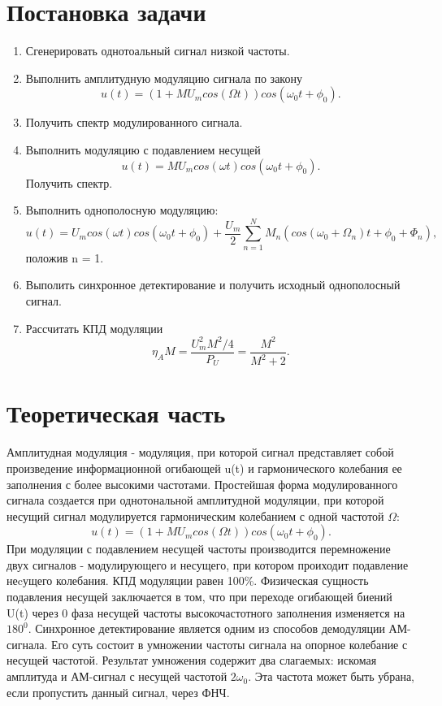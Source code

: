 \documentclass[10pt,a4paper]{report}
\begin{document}
\section{Постановка задачи}
	\begin{enumerate}
		\item Сгенерировать однотоальный сигнал низкой частоты.
		\item Выполнить амплитудную модуляцию сигнала по закону
				\begin{equation}
					u(t) = (1+MU_m cos(\Omega t))cos(\omega_0 t+\phi_0).
				\end{equation}
		\item Получить спектр модулированного сигнала.
		\item Выполнить модуляцию с подавлением несущей 
				\begin{equation}
					u(t) = MU_m cos(\omega t)cos(\omega_0 t+\phi_0).
				\end{equation}
		      Получить спектр. 
		\item Выполнить однополосную модуляцию:
				\begin{equation}
					u(t) = U_m cos(\omega t)cos(\omega_0 t+\phi_0)+\frac{U_m}{2}\sum_{n=1}^N M_n (cos(\omega_0 + \Omega_n )t + \phi_0 + \Phi_n ),
				\end{equation}
				положив n = 1.
		\item Выполить синхронное детектирование и получить исходный однополосный сигнал.
		\item Рассчитать КПД модуляции
				\begin{equation}
					\eta_A M = \frac{U_m ^2 M^2 /4}{P_U} = \frac{M^2}{M^2 + 2}.
				\end{equation}
	\end{enumerate}
\section{Теоретическая часть}
Амплитудная модуляция - модуляция, при которой сигнал представляет собой произведение информационной огибающей u(t) и гармонического колебания ее заполнения с более высокими частотами. Простейшая форма модулированного сигнала создается при однотональной амплитудной модуляции, при которой несущий сигнал модулируется гармоническим колебанием с одной частотой $\Omega$:
	\begin{equation}
		u(t) = (1+MU_m cos(\Omega t))cos(\omega_0 t+\phi_0).
	\end{equation}
При модуляции с подавлением несущей частоты производится перемножение двух сигналов - модулирующего и несущего, при котором проиходит подавление неcущего колебания. КПД модуляции равен 100\%. 
Физическая сущность подавления несущей заключается в том, что при переходе огибающей биений U(t) через 0 фаза несущей частоты высокочастотного заполнения изменяется на $180^0$.
Синхронное детектирование является одним из способов демодуляции АМ-сигнала. Его суть состоит в умножении частоты сигнала на опорное колебание с несущей частотой. Результат умножения содержит два слагаемых: искомая амплитуда и АМ-сигнал с несущей частотой $2\omega_0$. Эта частота может быть убрана, если пропустить данный сигнал, через ФНЧ.
\end{document}
